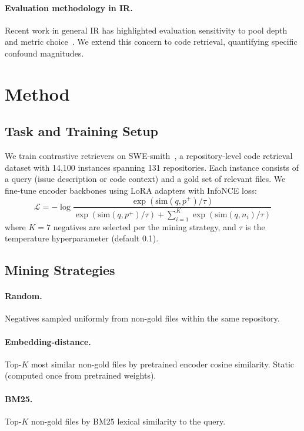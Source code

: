 \documentclass[11pt]{article}
\begin{document}
\paragraph{Evaluation methodology in IR.} Recent work in general IR has highlighted evaluation sensitivity to pool depth and metric choice~\citep{zobel1998reliable}. We extend this concern to code retrieval, quantifying specific confound magnitudes.

\section{Method}

\subsection{Task and Training Setup}

We train contrastive retrievers on SWE-smith~\citep{swesmith2025}, a repository-level code retrieval dataset with 14,100 instances spanning 131 repositories. Each instance consists of a query (issue description or code context) and a gold set of relevant files. We fine-tune encoder backbones using LoRA adapters with InfoNCE loss:
\begin{equation}
\mathcal{L} = -\log \frac{\exp(\text{sim}(q, p^+)/\tau)}{\exp(\text{sim}(q, p^+)/\tau) + \sum_{i=1}^{K}\exp(\text{sim}(q, n_i)/\tau)}
\end{equation}
where $K=7$ negatives are selected per the mining strategy, and $\tau$ is the temperature hyperparameter (default 0.1).

\subsection{Mining Strategies}

\paragraph{Random.} Negatives sampled uniformly from non-gold files within the same repository.

\paragraph{Embedding-distance.} Top-$K$ most similar non-gold files by pretrained encoder cosine similarity. Static (computed once from pretrained weights).

\paragraph{BM25.} Top-$K$ non-gold files by BM25 lexical similarity to the query.
\end{document}
